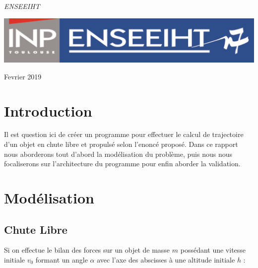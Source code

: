 \documentclass[a4paper,oneside]{article}
\begin{document}
\begin{titlepage}
	\vspace{0.5\baselineskip} %

	\textit{ENSEEIHT} %

	\vfill %


	\includegraphics[scale=0.3]{logoN7.png} %

	\vspace{0.3\baselineskip} %

Fevrier 2019 %



\end{titlepage}
\newpage

\tableofcontents
\newpage



\section{Introduction}
Il est question ici de créer un programme pour effectuer le calcul de trajectoire d'un objet en chute libre et propulsé selon l'enoncé proposé.
Dans ce rapport nous aborderons tout d'abord la modélisation du problème, puis nous nous focaliserons sur l'architecture du programme pour enfin aborder la validation.

\section{Modélisation}

\subsection{Chute Libre}

Si on effectue le bilan des forces sur un objet de masse $m$ possédant une vitesse initiale $v_0$ formant un angle $\alpha$ avec l'axe des abscisses à une altitude initiale $h$ :
\end{document}
